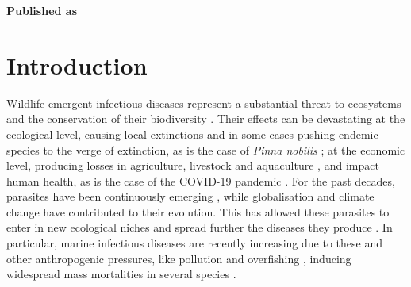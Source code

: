\vspace{3cm}






\textbf{Published as}

\vspace{0.5cm}


\newpage
\section{Introduction}

Wildlife emergent infectious diseases represent a substantial threat to
ecosystems and the conservation of their biodiversity \cite{Daszak443}. Their
effects can be devastating at the ecological level, causing local extinctions
\cite{Daszak443} and in some cases pushing endemic species to the verge of
extinction, as is the case of \textit{Pinna nobilis}
\cite{Cabanellas2019}; at the economic level, producing losses in agriculture,
livestock and aquaculture \cite{Vurro2010, Tomley2009, Pernet2016}, and impact
human health, as is the case of the COVID-19 pandemic \cite{Salata2020}. For
the past decades, parasites have been continuously emerging \cite{Morens2004,
    Daszak2017}, while globalisation and climate change have contributed to
their
evolution. This has allowed these parasites to enter in new ecological niches
and spread further the diseases they produce \cite{Aguirre2008}. In particular,
marine infectious diseases are recently increasing due to these and other
anthropogenic pressures, like pollution and overfishing \cite{Lafferty2004},
inducing widespread mass mortalities in several species \cite{Eisenlord2016,
    JONES201648, VAZQUEZ2017}.

